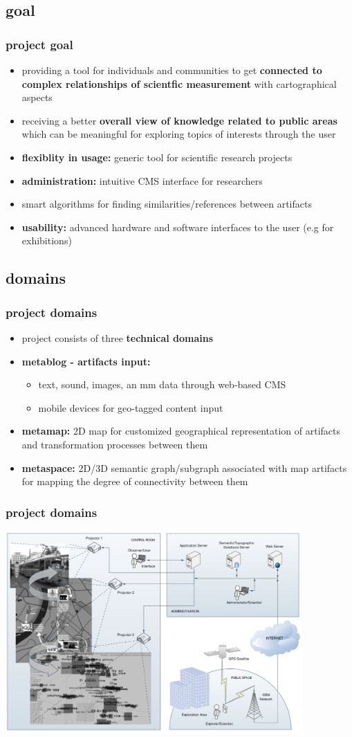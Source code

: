 \documentclass[blue]{beamer}
\begin{document}
\subsection{goal}
\frame
{
\frametitle{\textbf{project goal}}
\begin{itemize}
\item providing a tool for individuals and communities to get \textbf{connected to complex relationships of scientfic measurement} with cartographical aspects
\item receiving a better \textbf{overall view of knowledge related to public areas} which can be meaningful for exploring topics of interests through the user
\item \textbf{flexiblity in usage:} generic tool for scientific research projects
\item \textbf{administration:} intuitive CMS interface for researchers
\item smart algorithms for finding similarities/references between artifacts
\item \textbf{usability:} advanced hardware and software interfaces to the user (e.g for exhibitions)
\end{itemize}
}


\subsection{domains}
\frame
{
\frametitle{\textbf{project domains}}
\begin{itemize}
\item project consists of three \textbf{technical domains} 
\item \textbf{metablog - artifacts input:}
  \begin{itemize}
    \item text, sound, images, an mm data through web-based CMS
    \item mobile devices for geo-tagged content input
  \end{itemize}
\item \textbf{metamap:} 2D map for customized geographical representation of artifacts and transformation processes between them
\item \textbf{metaspace:} 2D/3D semantic graph/subgraph associated with map artifacts for mapping the degree of connectivity between them
\end{itemize}
}

\frame
{
\frametitle{\textbf{project domains}}
\includegraphics[width=0.85\textwidth]{bin/domains/domains.png}
}
\end{document}
